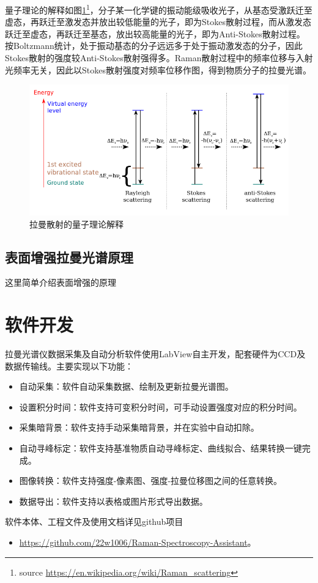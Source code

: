 \documentclass[UTF8]{article}
\begin{document}
	量子理论的解释如图\ref{Raman}\footnote{source \url{https://en.wikipedia.org/wiki/Raman_scattering}}，分子某一化学键的振动能级吸收光子，从基态受激跃迁至虚态，再跃迁至激发态并放出较低能量的光子，即为Stokes散射过程，而从激发态跃迁至虚态，再跃迁至基态，放出较高能量的光子，即为Anti-Stokes散射过程。按Boltzmann统计，处于振动基态的分子远远多于处于振动激发态的分子，因此Stokes散射的强度较Anti-Stokes散射强得多。Raman散射过程中的频率位移与入射光频率无关，因此以Stokes散射强度对频率位移作图，得到物质分子的拉曼光谱。
	\begin{figure}[htp]
		\centering
		\includegraphics[width=0.9\linewidth]{figures/Ramanscattering.png}
		\caption{拉曼散射的量子理论解释} \label{Raman}
	\end{figure}

	\subsection{表面增强拉曼光谱原理}
	这里简单介绍表面增强的原理


	\section{软件开发}
	拉曼光谱仪数据采集及自动分析软件使用LabView自主开发，配套硬件为CCD及数据传输线。主要实现以下功能：
	\begin{itemize}
		\item 自动采集：软件自动采集数据、绘制及更新拉曼光谱图。
		\item 设置积分时间：软件支持可变积分时间，可手动设置强度对应的积分时间。
		\item 采集暗背景：软件支持手动采集暗背景，并在实验中自动扣除。
		\item 自动寻峰标定：软件支持基准物质自动寻峰标定、曲线拟合、结果转换一键完成。
		\item 图像转换：软件支持强度-像素图、强度-拉曼位移图之间的任意转换。
		\item 数据导出：软件支持以表格或图片形式导出数据。
	\end{itemize}
	软件本体、工程文件及使用文档详见github项目 
	\begin{itemize}
		\item \url{https://github.com/22w1006/Raman-Spectroscopy-Assistant}。
	\end{itemize}
	
\end{document}
